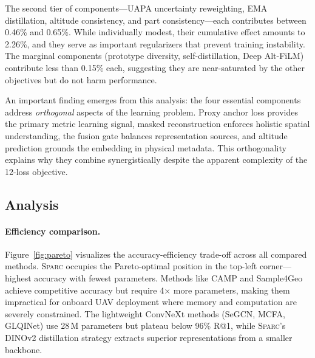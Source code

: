 \documentclass[sigconf, anonymous, review]{acmart}
\newcommand{\ours}{\textsc{Sparc}}
\begin{document}
The second tier of components---UAPA uncertainty reweighting, EMA distillation, altitude consistency, and part consistency---each contributes between 0.46\% and 0.65\%.
While individually modest, their cumulative effect amounts to 2.26\%, and they serve as important regularizers that prevent training instability.
The marginal components (prototype diversity, self-distillation, Deep Alt-FiLM) contribute less than 0.15\% each, suggesting they are near-saturated by the other objectives but do not harm performance.

An important finding emerges from this analysis: the four essential components address \emph{orthogonal} aspects of the learning problem.
Proxy anchor loss provides the primary metric learning signal, masked reconstruction enforces holistic spatial understanding, the fusion gate balances representation sources, and altitude prediction grounds the embedding in physical metadata.
This orthogonality explains why they combine synergistically despite the apparent complexity of the 12-loss objective.

\subsection{Analysis}
\label{sec:analysis}

\paragraph{Efficiency comparison.}
Figure~\ref{fig:pareto} visualizes the accuracy-efficiency trade-off across all compared methods.
\ours{} occupies the Pareto-optimal position in the top-left corner---highest accuracy with fewest parameters.
Methods like CAMP and Sample4Geo achieve competitive accuracy but require 4$\times$ more parameters, making them impractical for onboard UAV deployment where memory and computation are severely constrained.
The lightweight ConvNeXt methods (SeGCN, MCFA, GLQINet) use 28\,M parameters but plateau below 96\% R@1, while \ours{}'s DINOv2 distillation strategy extracts superior representations from a smaller backbone.
\end{document}
